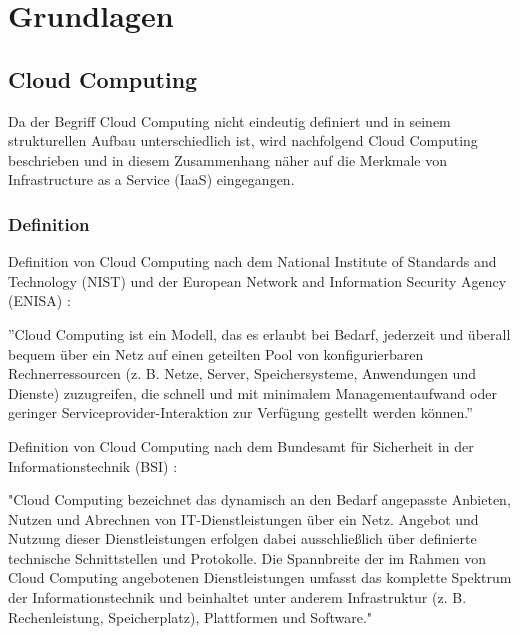 \documentclass[13pt,a4paper,bibliography=totocnumbered,listof=totocnumbered]{scrartcl}
\begin{document}
\section{Grundlagen}\label{GrundlagenV}
\subsection{Cloud Computing}
Da der Begriff Cloud Computing nicht eindeutig definiert und in seinem strukturellen Aufbau unterschiedlich ist, wird nachfolgend Cloud Computing beschrieben und in diesem Zusammenhang näher auf die Merkmale von Infrastructure as a Service (IaaS) eingegangen.
\subsubsection{Definition}
Definition von Cloud Computing nach dem National Institute of Standards and Technology (NIST) und der European Network and Information Security Agency (ENISA) \cite{34}:

''Cloud Computing ist ein Modell, das es erlaubt bei Bedarf, jederzeit und überall bequem über ein Netz auf einen geteilten Pool von konfigurierbaren Rechnerressourcen (z. B. Netze, Server, Speichersysteme, Anwendungen und Dienste) zuzugreifen, die schnell und mit minimalem Managementaufwand oder geringer Serviceprovider-Interaktion zur Verfügung gestellt werden können.''

Definition von Cloud Computing nach dem Bundesamt für Sicherheit in der Informationstechnik (BSI) \cite{35}:

"Cloud Computing bezeichnet das dynamisch an den Bedarf angepasste Anbieten, Nutzen und Abrechnen von IT-Dienstleistungen über ein Netz. Angebot und Nutzung dieser Dienstleistungen erfolgen dabei ausschließlich über definierte technische Schnittstellen und Protokolle. Die Spannbreite der im Rahmen von Cloud Computing angebotenen Dienstleistungen umfasst das komplette Spektrum der Informationstechnik und beinhaltet unter anderem Infrastruktur (z. B. Rechenleistung, Speicherplatz), Plattformen und Software."
\end{document}
